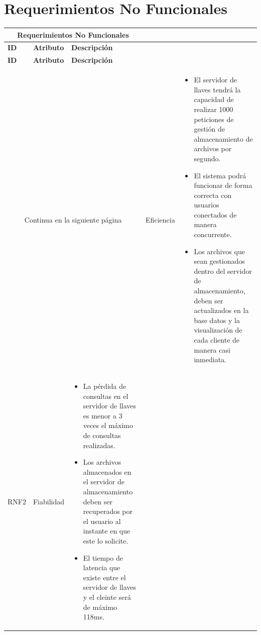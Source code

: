 \section{Requerimientos No Funcionales }
\begin{longtable}{| p{1.5cm} | p{3cm} | p{11cm} |}

\hline
\multicolumn{3}{|c|}{\textbf{Requerimientos No Funcionales}} \\ \hline
\textbf{ID} &  \textbf{Atributo} & \textbf{Descripción}\\
\hline \hline
\endfirsthead

\hline
\textbf{ID} &  \textbf{Atributo} & \textbf{Descripción}\\
\hline \hline
\endhead

\multicolumn{3}{|c|}{Continua en la siguiente página}
\endfoot

\endlastfoot

RNF1 & Eficiencia &  \begin{itemize} 
   \item El servidor de llaves tendrá la capacidad de realizar 1000 peticiones de gestión de almacenamiento de archivos por segundo. 
   \item El sistema podrá funcionar de forma correcta con usuarios conectados de manera concurrente. 
   \item Los archivos que sean gestionados dentro del servidor de almacenamiento, deben ser actualizados en la base datos y la visualización de cada cliente de manera casi inmediata. 
  \end{itemize}
\\ \hline

RNF2 & Fiabilidad &  \begin{itemize} 
  \item La pérdida de consultas en el servidor de llaves es menor a 3 veces el máximo de consultas realizadas. 
   \item Los archivos almacenados en el servidor de almacenamiento deben ser recuperados por el usuario al instante en que este lo solicite. 
   \item El tiempo de latencia que existe entre el servidor de llaves y el cleinte será de máximo 118ms. 
 \end{itemize}
\\ \hline


\end{longtable}
